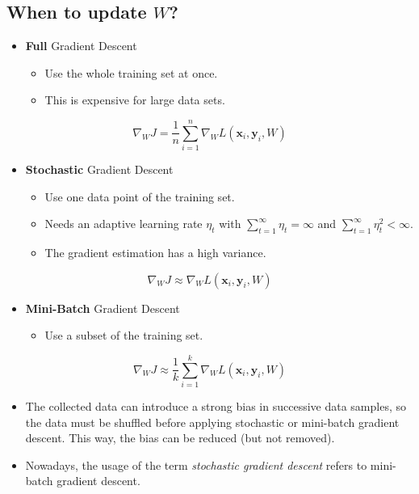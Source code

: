 \documentclass[a4paper, 11pt, accentcolor = tud3b]{tudreport}
\renewcommand{\vec}[1]{\mathbf{#1}}
\begin{document}
			\subsection{When to update \(W\)?}
				\begin{itemize}
					\item \textbf{Full} Gradient Descent
						\begin{itemize}
							\item Use the whole training set at once.
							\item This is expensive for large data sets.
						\end{itemize}
				\end{itemize}
				\begin{equation}
					\nabla_W J = \frac{1}{n} \sum_{i = 1}^{n} \nabla_W L(\vec{x}_i, \vec{y}_i, W)
				\end{equation}
				\begin{itemize}
					\item \textbf{Stochastic} Gradient Descent
						\begin{itemize}
							\item Use one data point of the training set.
							\item Needs an adaptive learning rate \( \eta_t \) with \( \sum_{t = 1}^{\infty} \eta_t = \infty \) and \( \sum_{t = 1}^{\infty} \eta_t^2 < \infty \).
							\item The gradient estimation has a high variance.
						\end{itemize}
				\end{itemize}
				\begin{equation}
					\nabla_W J \approx \nabla_W L(\vec{x}_i, \vec{y}_i, W)
				\end{equation}
				\begin{itemize}
					\item \textbf{Mini-Batch} Gradient Descent
						\begin{itemize}
							\item Use a subset of the training set.
						\end{itemize}
				\end{itemize}
				\begin{equation}
					\nabla_W J \approx \frac{1}{k} \sum_{i = 1}^{k} \nabla_W L(\vec{x}_i, \vec{y}_i, W)
				\end{equation}
				\begin{itemize}
					\item The collected data can introduce a strong bias in successive data samples, so the data must be shuffled before applying stochastic or mini-batch gradient descent. This way, the bias can be reduced (but not removed).
					\item Nowadays, the usage of the term \emph{stochastic gradient descent} refers to mini-batch gradient descent.
				\end{itemize}
\end{document}
